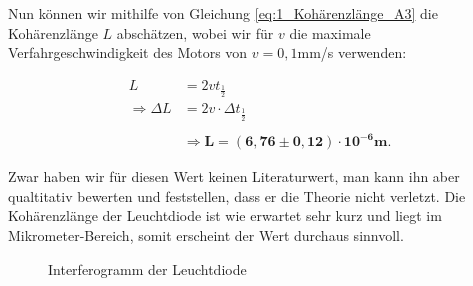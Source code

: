 \documentclass{article}
\begin{document}
Nun können wir mithilfe von Gleichung \ref{eq:1_Kohärenzlänge_A3} die Kohärenzlänge $L$ abschätzen, wobei wir für $v$ die maximale Verfahrgeschwindigkeit des Motors von $v = 0,1$mm/s verwenden:

\begin{equation}
    \begin{split}
        L &= 2 v t_\frac{1}{2} \\
        \Rightarrow \Delta L &= 2 v \cdot \Delta t_\frac{1}{2} \\ \\
        &\Rightarrow \bm{L = (6,76 \pm 0,12) \cdot 10^{-6}} \textbf{m}.
    \end{split}
\end{equation}

Zwar haben wir für diesen Wert keinen Literaturwert, man kann ihn aber qualtitativ bewerten und feststellen, dass er die Theorie nicht verletzt. Die Kohärenzlänge der Leuchtdiode ist wie erwartet sehr kurz und liegt im Mikrometer-Bereich, somit erscheint der Wert durchaus sinnvoll.

\begin{figure}[!bp]
  \centering
  \hfill
  \hfill
  \hfill
  \caption{Interferogramm der Leuchtdiode}
  \label{fig:KohärenzlängeMessung}
\end{figure}

\clearpage
\newpage
\end{document}
